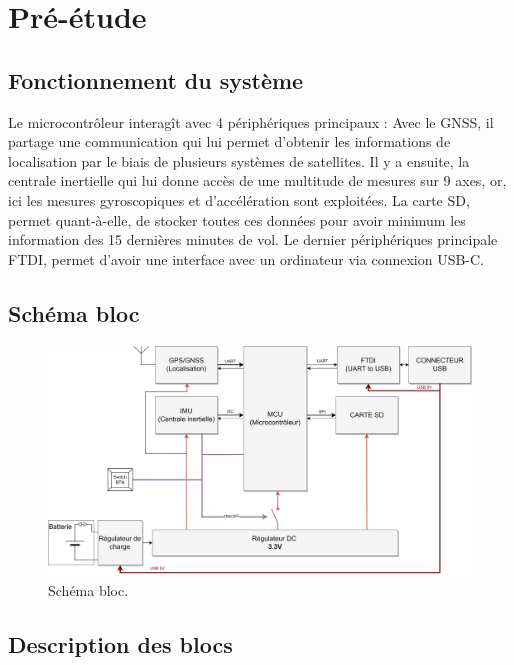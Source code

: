 \section{Pré-étude} \label{sec:Pre-Etude}

\subsection{Fonctionnement du système} \label{ssec:Fonctionnement}
Le microcontrôleur interagît avec 4 périphériques principaux : Avec le \gls{GNSS}, il partage une communication qui lui permet d'obtenir les informations de localisation par le biais de plusieurs systèmes de satellites. Il y a ensuite, la centrale inertielle qui lui donne accès de une multitude de mesures sur 9 axes, or, ici les mesures gyroscopiques et d'accélération sont exploitées. La carte SD, permet quant-à-elle, de stocker toutes ces données pour avoir minimum les information des 15 dernières minutes de vol. Le dernier périphériques principale \gls{FTDI}, permet d'avoir une interface avec un ordinateur via connexion USB-C.

\subsection{Schéma bloc} \label{ssec:Schema-bloc}

\begin{figure}[h]
	\centering
	\includegraphics[width=1\textwidth]{../figures/cdc/blocs_grossiers_no_antenna.jpg}
	\caption{Schéma bloc.}
	\label{fig:schbloc}
\end{figure}
\subsection{Description des blocs} \label{ssec:Desc-blocs}

